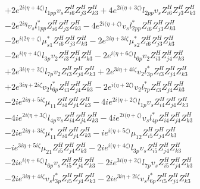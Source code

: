 \begin{align}
 &+2 e^{2 i \Big(\eta +4 \zeta \Big)} l_{1pp} v_s Z_{{i 6}}^{H} Z_{{j 3}}^{H} Z_{{k 3}}^{H} +4 e^{2 i \Big(\eta +3 \zeta \Big)} l_{2pp} v_s Z_{{i 6}}^{H} Z_{{j 3}}^{H} Z_{{k 3}}^{H} \nonumber \\ 
 &-2 e^{2 i \eta } v_s l_{1pp}^* Z_{{i 6}}^{H} Z_{{j 3}}^{H} Z_{{k 3}}^{H} -4 e^{2 i \Big(\eta +\zeta \Big)} v_s l_{2pp}^* Z_{{i 6}}^{H} Z_{{j 3}}^{H} Z_{{k 3}}^{H} \nonumber \\ 
 &-2 e^{i \Big(2 \eta +\zeta \Big)} \mu_{s1}^* Z_{{i 6}}^{H} Z_{{j 3}}^{H} Z_{{k 3}}^{H} -2 e^{2 i \eta +3 i \zeta } \mu_{s2}^* Z_{{i 6}}^{H} Z_{{j 3}}^{H} Z_{{k 3}}^{H} \nonumber \\ 
 &-2 e^{i \Big(\eta +4 \zeta \Big)} l_{3p} v_2 Z_{{i 3}}^{H} Z_{{j 4}}^{H} Z_{{k 3}}^{H} -2 e^{i \Big(\eta +6 \zeta \Big)} l_{6p} v_2 Z_{{i 3}}^{H} Z_{{j 4}}^{H} Z_{{k 3}}^{H} \nonumber \\ 
 &+2 e^{3 i \Big(\eta +2 \zeta \Big)} l_{7p} v_2 Z_{{i 3}}^{H} Z_{{j 4}}^{H} Z_{{k 3}}^{H} +2 e^{3 i \eta +4 i \zeta } v_2 l_{3p}^* Z_{{i 3}}^{H} Z_{{j 4}}^{H} Z_{{k 3}}^{H} \nonumber \\ 
 &+2 e^{3 i \eta +2 i \zeta } v_2 l_{6p}^* Z_{{i 3}}^{H} Z_{{j 4}}^{H} Z_{{k 3}}^{H} -2 e^{i \Big(\eta +2 \zeta \Big)} v_2 l_{7p}^* Z_{{i 3}}^{H} Z_{{j 4}}^{H} Z_{{k 3}}^{H} \nonumber \\ 
 &-2 i e^{2 i \eta +5 i \zeta } \mu_{11} Z_{{i 4}}^{H} Z_{{j 4}}^{H} Z_{{k 3}}^{H} -4 i e^{2 i \Big(\eta +2 \zeta \Big)} l_{1p} v_s Z_{{i 4}}^{H} Z_{{j 4}}^{H} Z_{{k 3}}^{H} \nonumber \\ 
 &-4 i e^{2 i \Big(\eta +3 \zeta \Big)} l_{4p} v_s Z_{{i 4}}^{H} Z_{{j 4}}^{H} Z_{{k 3}}^{H} -4 i e^{2 i \Big(\eta +\zeta \Big)} v_s l_{4p}^* Z_{{i 4}}^{H} Z_{{j 4}}^{H} Z_{{k 3}}^{H} \nonumber \\ 
 &-2 i e^{2 i \eta +3 i \zeta } \mu_{11}^* Z_{{i 4}}^{H} Z_{{j 4}}^{H} Z_{{k 3}}^{H} -i e^{i \Big(\eta +5 \zeta \Big)} \mu_{12} Z_{{i 5}}^{H} Z_{{j 4}}^{H} Z_{{k 3}}^{H} \nonumber \\ 
 &-i e^{3 i \eta +5 i \zeta } \mu_{21} Z_{{i 5}}^{H} Z_{{j 4}}^{H} Z_{{k 3}}^{H} -2 i e^{i \Big(\eta +4 \zeta \Big)} l_{3p} v_s Z_{{i 5}}^{H} Z_{{j 4}}^{H} Z_{{k 3}}^{H} \nonumber \\ 
 &-2 i e^{i \Big(\eta +6 \zeta \Big)} l_{6p} v_s Z_{{i 5}}^{H} Z_{{j 4}}^{H} Z_{{k 3}}^{H} -2 i e^{3 i \Big(\eta +2 \zeta \Big)} l_{7p} v_s Z_{{i 5}}^{H} Z_{{j 4}}^{H} Z_{{k 3}}^{H} \nonumber \\ 
 &-2 i e^{3 i \eta +4 i \zeta } v_s l_{3p}^* Z_{{i 5}}^{H} Z_{{j 4}}^{H} Z_{{k 3}}^{H} -2 i e^{3 i \eta +2 i \zeta } v_s l_{6p}^* Z_{{i 5}}^{H} Z_{{j 4}}^{H} Z_{{k 3}}^{H} \nonumber \\ 

\end{align}
